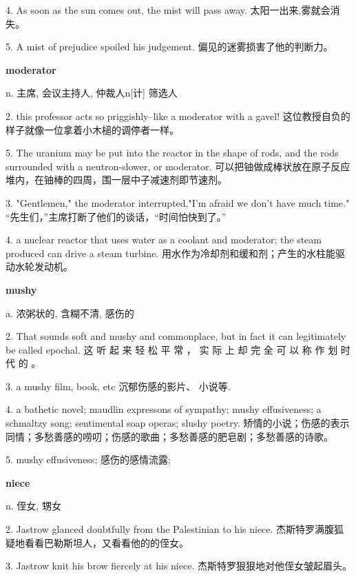 \documentclass[12pt]{book}
\begin{document}
4.  As soon as the sun comes out, the mist will pass away.  太阳一出来,雾就会消失。 


5.  A mist of prejudice spoiled his judgement.  偏见的迷雾损害了他的判断力。 


\vspace{12pt}

\textbf{moderator}

n. 主席, 会议主持人, 仲裁人n[计] 筛选人

2.  this professor acts so priggishly--like a moderator with a gavel!  这位教授自负的样子就像一位拿着小木槌的调停者一样。 


5.  The uranium may be put into the reactor in the shape of rods, and the rods surrounded with a neutron-slower, or moderator.  可以把铀做成棒状放在原子反应堆内，在铀棒的四周，围一层中子减速剂即节速剂。 


3.  "Gentlemen," the moderator interrupted,"I'm afraid we don't have much time."  “先生们，”主席打断了他们的谈话，“时间怕快到了。” 


4.  a nuclear reactor that uses water as a coolant and moderator; the steam produced can drive a steam turbine.  用水作为冷却剂和缓和剂；产生的水柱能驱动水轮发动机。 


\vspace{12pt}

\textbf{mushy}

a. 浓粥状的, 含糊不清, 感伤的

2.  That sounds soft and mushy and commonplace, but in fact it can legitimately be called epochal.  这 听 起 来 轻 松 平 常 ， 实 际 上 却 完 全 可 以 称 作 划 时 代 的 。 


3.  a mushy film, book, etc  沉郁伤感的影片、 小说等. 


4.  a bathetic novel; maudlin expressons of sympathy; mushy effusiveness; a schmaltzy song; sentimental soap operas; slushy poetry.  矫情的小说；伤感的表示同情；多愁善感的唠叨；伤感的歌曲；多愁善感的肥皂剧；多愁善感的诗歌。 


5.  mushy effusiveness;  感伤的感情流露; 


\vspace{12pt}

\textbf{niece}

n. 侄女, 甥女

2.  Jastrow glanced doubtfully from the Palestinian to his niece.  杰斯特罗满腹狐疑地看看巴勒斯坦人，又看看他的的侄女。 


3.  Jastrow knit his brow fiercely at his niece.  杰斯特罗狠狠地对他侄女皱起眉头。 
\end{document}
